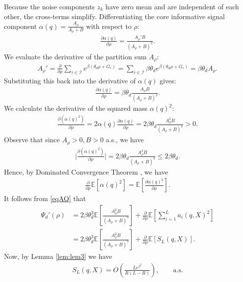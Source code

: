 \documentclass[11pt,a4paper]{article}
\theoremstyle{definition}
\begin{document}
Because the noise components $z_k$ have zero mean and are independent of each other, the cross-terms simplify. Differentiating the core informative signal component $\alpha(q) = \frac{A_\rho}{A_\rho + B}$ with respect to $\rho$:
\begin{align}
\frac{\partial \alpha(q)}{\partial \rho} =  \frac{A_\rho' B}{(A_\rho + B)^2}.
\end{align}
We evaluate the derivative of the partition sum $A_\rho$:
\begin{align}
A_\rho' = \frac{\partial}{\partial \rho} \sum_{i \in \mathcal{I}} e^{\beta(\theta_d \rho + G_i)} = \sum_{i \in \mathcal{I}} \beta \theta_d e^{\beta(\theta_d \rho + G_i)} = \beta \theta_d A_\rho.
\end{align}
Substituting this back into the derivative of $\alpha(q)$ gives:
\begin{align}
\frac{\partial \alpha(q)}{\partial \rho} = \beta \theta_d \frac{A_\rho B}{(A_\rho + B)^2}.
\end{align}
We calculate the derivative of the squared mass $\alpha(q)^2$:
\begin{align}
\frac{\partial (\alpha(q)^2)}{\partial \rho} = 2 \alpha(q) \frac{\partial \alpha(q)}{\partial \rho} = 2 \beta \theta_d \frac{A_\rho^2 B}{(A_\rho + B)^3} > 0.
\end{align}
Observe that since $A_{\rho}>0, B>0$ a.s., we have
\begin{align}
\bigg|\frac{\partial (\alpha(q)^2)}{\partial \rho}\bigg|= 2 \beta \theta_d \frac{A_\rho^2 B}{(A_\rho + B)^3}\leq 2 \beta \theta_d. 
\end{align}
Hence, by Dominated Convergence Theorem \cite{Royden}, we have
\begin{align}
 \frac{\partial}{\partial \rho} \mathbb{E}\left[ \alpha(q)^2 \right] = \mathbb E\left[\frac{\partial \alpha(q)^2}{\partial \rho}\right].
\end{align}
It follows from \eqref{eqAQ} that
\begin{align}
\Psi_d'(\rho)& = 2 \beta \theta_d^3 \mathbb{E}\left[ \frac{A_\rho^2 B}{(A_\rho + B)^3} \right] + \frac{\partial}{\partial \rho} \mathbb{E}\left[ \sum_{i=1}^L a_i(q, X)^2 \right]\\
&= 2 \beta \theta_d^3 \mathbb{E}\left[ \frac{A_\rho^2 B}{(A_\rho + B)^3} \right] + \frac{\partial}{\partial \rho} \mathbb{E}\left[ S_L(q,X) \right] \label{cur1}.
\end{align}
Now, by Lemma \ref{lem:lem3} we have
\begin{align}
S_L(q,X)= O\left( \frac{L  e^{\beta^2}}{R(L-R)}\right), \qquad\text{a.s.}
\end{align}
\end{document}
